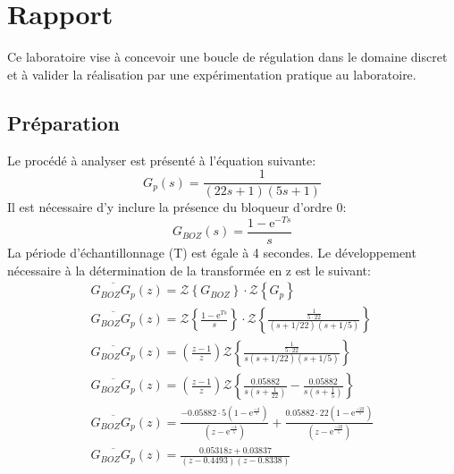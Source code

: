 



\label{s:experimentation}
\chapter{Rapport}
\label{cha:projet}
Ce laboratoire vise à concevoir une boucle de régulation dans le domaine discret et à valider la réalisation par une expérimentation pratique au laboratoire.
\section{Préparation}
Le procédé à analyser est présenté à l'équation suivante:
\begin{equation}
	G_p(s) = \frac{1}{(22s +1)(5s+1)}
\end{equation}
Il est nécessaire d'y inclure la présence du bloqueur d'ordre 0:
\begin{equation}
	G_{BOZ}(s) = \frac{1 - \mbox{e}^{-Ts}}{s}
\end{equation}
La période d'échantillonnage (T) est égale à 4 secondes. Le développement nécessaire à la détermination de la transformée en z est le suivant:
\begin{gather}
\overline{G_{BOZ}G_p}(z) = \mathcal{Z}\left\lbrace G_{BOZ}\right\rbrace \cdot \mathcal{Z}\left\lbrace G_{p}\right\rbrace\\
\overline{G_{BOZ}G_p}(z) = \mathcal{Z}\left\lbrace \frac{1 - \mbox{e}^{Ts}}{s}\right\rbrace \cdot \mathcal{Z}\left\lbrace \frac{\frac{1}{5 \cdot 22}}{(s + 1/22)(s+1/5)}\right\rbrace\\
\overline{G_{BOZ}G_p}(z) =  \left(\frac{z-1}{z}\right) \mathcal{Z}\left\lbrace \frac{\frac{1}{5 \cdot 22}}{s(s + 1/22)(s+1/5)}\right\rbrace\\
\overline{G_{BOZ}G_p}(z) =  \left(\frac{z-1}{z}\right) \mathcal{Z}\left\lbrace \frac{0.05882}{s(s + \frac{1}{22})} - \frac{0.05882}{s(s + \frac{1}{5})}\right\rbrace\\
\overline{G_{BOZ}G_p}(z) = \frac{-0.05882\cdot 5 (1-\mbox{e}^{\frac{-4}{5}})}{(z-\mbox{e}^{\frac{-4}{5}})} + \frac{0.05882\cdot 22(1-\mbox{e}^{\frac{-22}{5}})}{(z-\mbox{e}^{\frac{-22}{5}})}\\
\overline{G_{BOZ}G_p}(z) = \frac{0.05318z + 0.03837}{(z-0.4493)(z-0.8338)}
\end{gather}
